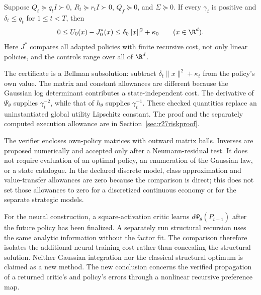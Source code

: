 \begin{theorem}\label{thm:r27entropic}
Suppose $Q_t\succeq q_tI\succ0$, $R_t\succeq r_tI\succ0$, $Q_f\succeq0$,
and $\Sigma\succeq0$. If every $\gamma_t$ is positive and
$\delta_t\leq q_t$ for $1\leq t<T$, then
\begin{equation}\label{eq:r27riskgap}
 0\leq U_0(x)-J_0^*(x)\leq\delta_0\|x\|^2+\kappa_0
 \qquad(x\in\R^d).
\end{equation}
Here $J^*$ compares all adapted policies with finite recursive cost, not only
linear policies, and the controls range over all of $\R^d$.
\end{theorem}

The certificate is a Bellman subsolution: subtract
$\delta_t\|x\|^2+\kappa_t$ from the policy's own value. The matrix and constant
allowances are different because the Gaussian log determinant contributes a
state-independent cost. The derivative of $\Psi_\theta$ supplies
$\gamma_t^{-2}$, while that of $h_\theta$ supplies $\gamma_t^{-1}$.
These checked quantities replace an uninstantiated global utility Lipschitz
constant. The proof and the separately computed execution allowance are in
Section~\ref{sec:r27riskproof}.

The verifier encloses own-policy matrices with outward matrix balls. Inverses
are proposed numerically and accepted only after a Neumann-residual test.
It does not require evaluation of an optimal policy, an enumeration of the
Gaussian law, or a state catalogue. In the declared discrete model, class
approximation and value-transfer allowances are zero because the comparison
is direct; this does not set those allowances to zero for a discretized
continuous economy or for the separate strategic models.

For the neural construction, a square-activation critic learns
$d\Psi_\theta(P_{t+1})$ after the future policy has been finalized. A separately
run structural recursion uses the same analytic information without the
factor fit. The comparison therefore isolates the additional neural training
cost rather than concealing the structural solution. Neither Gaussian
integration nor the classical structural optimum is claimed as a new method.
The new conclusion concerns the verified propagation of a returned critic's
and policy's errors through a nonlinear recursive preference map.
